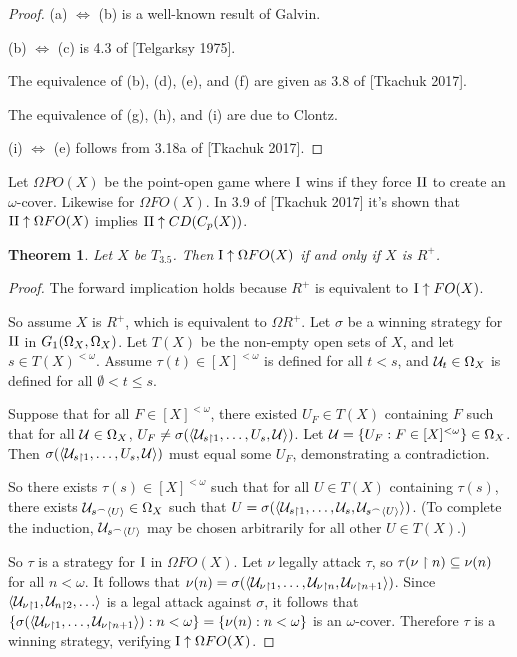 \documentclass[11pt]{article}
\theoremstyle{plain}
\newtheorem{theorem}{Theorem}
\theoremstyle{definition}
\theoremstyle{remark}
\theoremstyle{plain}
\theoremstyle{definition}
\theoremstyle{remark}
\begin{document}
\begin{proof}
  (a) \(\Leftrightarrow\) (b) is a well-known result of Galvin.

  (b) \(\Leftrightarrow\) (c) is 4.3 of [Telgarksy 1975].

  The equivalence of (b), (d), (e), and (f) are given as 3.8 of [Tkachuk 2017].

  The equivalence of (g), (h), and (i) are due to Clontz.

  (i) \(\Leftrightarrow\) (e) follows from 3.18a of [Tkachuk 2017].
\end{proof}

Let \(\Omega PO(X)\) be the point-open game where \(\mathrm{I}\) wins
if they force \(\mathrm{II}\) to create an \(\omega\)-cover. Likewise for
\(\Omega FO(X)\). In 3.9 of [Tkachuk 2017] it's shown that
\(\mathrm{II}\uparrow\Omega FO(X)\) implies \(\mathrm{II}\uparrow CD(C_p(X))\).

\begin{theorem}
  Let \(X\) be \(T_{3.5}\).
  Then \(\mathrm{I}\uparrow\Omega FO(X)\)
  if and only if \(X\) is \(R^+\).
\end{theorem}

\begin{proof}
  The forward implication holds because \(R^+\) is
  equivalent to \(\mathrm{I}\uparrow FO(X)\).

  So assume \(X\) is \(R^+\), which is equivalent to \(\Omega R^+\). 
  Let \(\sigma\) be a winning strategy for \(\mathrm{II}\) in 
  \(G_{1}(\Omega_X,\Omega_X)\). Let \(T(X)\) be the non-empty
  open sets of \(X\), and let \(s\in T(X)^{<\omega}\).
  Assume \(\tau(t)\in[X]^{<\omega}\) is defined for all \(t<s\),
  and \(\mathcal{U}_t\in\Omega_X\) is defined for all 
  \(\emptyset<t\leq s\). 

  Suppose that for all \(F\in[X]^{<\omega}\), there existed \(U_F\in T(X)\)
  containing \(F\) such that for all \(\mathcal{U}\in\Omega_X\),
  \(U_F\not=\sigma(\langle\mathcal{U}_{s\restriction 1},\dots,U_s,\mathcal{U}\rangle)\).
  Let \(\mathcal{U}=\{U_F:F\in[X]^{<\omega}\}\in\Omega_X\).
  Then \(\sigma(\langle\mathcal{U}_{s\restriction 1},\dots,U_s,\mathcal{U}\rangle)\)
  must equal some \(U_F\), demonstrating a contradiction.

  So there exists \(\tau(s)\in[X]^{<\omega}\) such that for all \(U\in T(X)\)
  containing \(\tau(s)\),
  there exists \(\mathcal{U}_{s{^\frown}\langle U\rangle}\in\Omega_X\) such that
  \(U=\sigma(\langle\mathcal{U}_{s\restriction 1},\dots,\mathcal{U}_s,\mathcal{U}_{s{^\frown}\langle U\rangle}\rangle)\).
  (To complete the induction, \(\mathcal{U}_{s{^\frown}\langle U\rangle}\) may be chosen
  arbitrarily for all other \(U\in T(X)\).)

  So \(\tau\) is a strategy for \(\mathrm{I}\) in \(\Omega FO(X)\).
  Let \(\nu\) legally attack \(\tau\), so
  \(\tau(\nu\restriction n)\subseteq \nu(n)\) for all \(n<\omega\).
  It follows that 
  \(\nu(n)=\sigma(\langle\mathcal{U}_{\nu\restriction 1},\dots,\mathcal{U}_{\nu\restriction n},\mathcal{U}_{\nu\restriction n+1}\rangle)\).
  Since \(\<\mc U_{\nu\rest 1},\mc U_{n\rest 2},\dots\>\) is a legal attack
  against \(\sigma\), it follows that
  \(\{\sigma(\langle\mathcal{U}_{\nu\restriction 1},\dots,\mathcal{U}_{\nu\restriction n+1}\rangle):n<\omega\}=\{\nu(n):n<\omega\}\)
  is an \(\omega\)-cover. Therefore \(\tau\) is a winning strategy, 
  verifying \(\mathrm{I}\uparrow\Omega FO(X)\).
\end{proof}
\end{document}

